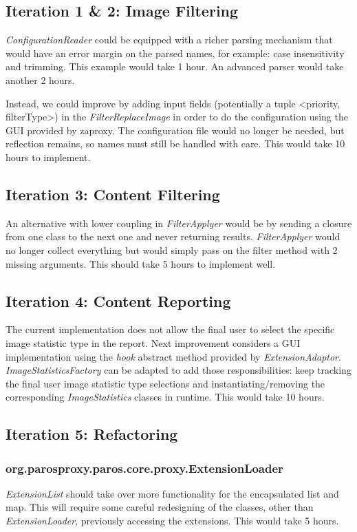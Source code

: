 \subsection{Iteration 1 \& 2: Image Filtering}


\textit{ConfigurationReader} could be equipped with a richer parsing mechanism that would have an error margin on the parsed names, for example: case insensitivity and trimming. This example would take 1 hour. An advanced parser would take another 2 hours.
\par
Instead, we could improve by adding input fields (potentially a tuple <priority, filterType>) in the \textit{FilterReplaceImage} in order to do the configuration using the GUI provided by zaproxy. The configuration file would no longer be needed, but reflection remains, so names must still be handled with care. This would take 10 hours to implement.
\subsection{Iteration 3: Content Filtering}
An alternative with lower coupling in \textit{FilterApplyer} would be by sending a closure from one class to the next one and never returning results. \textit{FilterApplyer} would no longer collect everything but would simply pass on the filter method with 2 missing arguments. This should take 5 hours to implement well.
\subsection{Iteration 4: Content Reporting}
The current implementation does not allow the final user to select the specific image statistic type in the report. Next improvement considers a GUI implementation using the \textit{hook} abstract method provided by \textit{ExtensionAdaptor}. \textit{ImageStatisticsFactory} can be adapted to add those responsibilities: keep tracking the final user image statistic type selections and instantiating/removing the corresponding \textit{ImageStatistics} classes in runtime. This would take 10 hours.

\subsection{Iteration 5: Refactoring}
\subsubsection{org.parosproxy.paros.core.proxy.ExtensionLoader}
\textit{ExtensionList} should take over more functionality for the encapsulated list and map. This will require some careful redesigning of the classes, other than \textit{ExtensionLoader}, previously accessing the extensions. This would take 5 hours.
